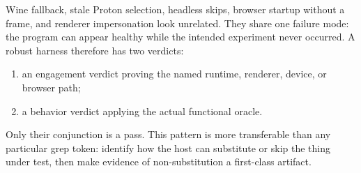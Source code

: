 Wine fallback, stale Proton selection, headless skips, browser startup without a frame, and
renderer impersonation look unrelated.  They share one failure mode: the program can appear
healthy while the intended experiment never occurred.  A robust harness therefore has two
verdicts:

\begin{enumerate}
  \item an engagement verdict proving the named runtime, renderer, device, or browser path;
  \item a behavior verdict applying the actual functional oracle.
\end{enumerate}

Only their conjunction is a pass.  This pattern is more transferable than any particular grep
token: identify how the host can substitute or skip the thing under test, then make evidence of
non-substitution a first-class artifact.
